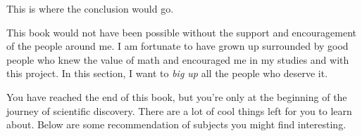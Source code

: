 
%
%

\label{chaptxer:end_matter}


\label{sec:conclusion}

	This is where the conclusion would go.


\label{sec:acknowledgments}
	
	This book would not have been possible without the support and encouragement of the people around me.
	I am fortunate to have grown up surrounded by good people who knew the value of math
	and encouraged me in my studies and with this project.
	In this section, I want to \emph{big up} all the people who deserve it.


\label{sec:further_reading}

	You have reached the end of this book,
	but you're only at the beginning of the journey of scientific discovery.
	There are a lot of cool things left for you to learn about.
	Below are some recommendation of subjects you might find interesting.
